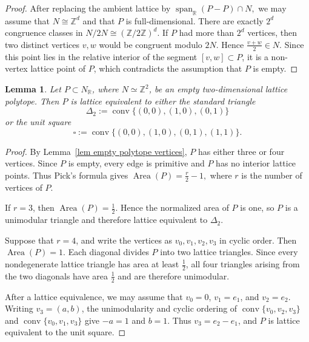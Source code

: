 \documentclass[11pt]{amsart}
\numberwithin{equation}{section}
\theoremstyle{plain}
\newtheorem{lemma}[theorem]{Lemma}
\theoremstyle{definition}
\newcommand{\0}{$0$-mutable}
\renewcommand{\1}{$1$-rigid}
\renewcommand{\0}{$0$-mutable}
\begin{document}
\begin{proof}
After replacing the ambient lattice by
$
\operatorname{span}_{\mathbb R}(P-P)\cap N,
$
we may assume that \(N\cong \mathbb Z^d\) and that \(P\) is
full-dimensional. There are exactly \(2^d\) congruence classes in
$
N/2N\cong(\mathbb Z/2\mathbb Z)^d.
$
If \(P\) had more than \(2^d\) vertices, then two distinct vertices
\(v,w\) would be congruent modulo \(2N\). Hence
$
\frac{v+w}{2}\in N.
$
Since this point lies in the relative interior of the segment
\([v,w]\subset P\), it is a non-vertex lattice point of \(P\), which
contradicts the assumption that \(P\) is empty.
\end{proof}



\begin{lemma}\label{lem empty lattice polygons}
Let \(P\subset N_{\mathbb R}\), where \(N\simeq\mathbb Z^2\), be an
empty two-dimensional lattice polytope. Then \(P\) is lattice
equivalent to either the standard triangle
\[
\Delta_2:=\operatorname{conv}\{(0,0),(1,0),(0,1)\}
\]
or the unit square
\[
\square:=\operatorname{conv}\{(0,0),(1,0),(0,1),(1,1)\}.
\]
\end{lemma}

\begin{proof}
By Lemma~\ref{lem empty polytope vertices}, \(P\) has either three or
four vertices. Since \(P\) is empty, every edge is primitive and
\(P\) has no interior lattice points. {Thus Pick's formula \cite[Theorem~2.8]{BR15}} gives
$
\operatorname{Area}(P)=\frac{r}{2}-1,
$
where \(r\) is the number of vertices of \(P\).

{
If \(r=3\), then \(\operatorname{Area}(P)=\frac12\). Hence the normalized
area of \(P\) is one, so \(P\) is a unimodular triangle and therefore
lattice equivalent to \(\Delta_2\).

Suppose that \(r=4\), and write the vertices as
\(v_0,v_1,v_2,v_3\) in cyclic order. Then
\(\operatorname{Area}(P)=1\). Each diagonal divides \(P\) into two
lattice triangles. Since every nondegenerate lattice triangle has area
at least \(\frac12\), all four triangles arising from the two diagonals
have area \(\frac12\) and are therefore unimodular.

After a lattice equivalence, we may assume that
\(v_0=0\), \(v_1=e_1\), and \(v_2=e_2\). Writing \(v_3=(a,b)\), the
unimodularity and cyclic ordering of
\(\operatorname{conv}\{v_0,v_2,v_3\}\) and
\(\operatorname{conv}\{v_0,v_1,v_3\}\) give \(-a=1\) and \(b=1\).
Thus \(v_3=e_2-e_1\), and \(P\) is lattice equivalent to the unit
square.}
\end{proof}
\end{document}
